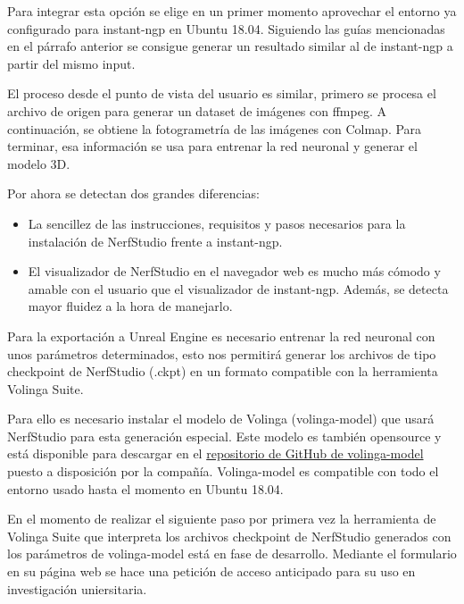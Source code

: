 \documentclass[a4paper, 12pt, spanish, twoside]{article}
\begin{document}
Para integrar esta opción se elige en un primer momento aprovechar el entorno ya configurado para instant-ngp en Ubuntu 18.04. Siguiendo las guías mencionadas en el párrafo anterior se consigue generar un resultado similar al de instant-ngp a partir del mismo input.  

El proceso desde el punto de vista del usuario es similar, primero se procesa el archivo de origen para generar un dataset de imágenes con ffmpeg. A continuación, se obtiene la fotogrametría de las imágenes con Colmap. Para terminar, esa información se usa para entrenar la red neuronal y generar el modelo 3D. 


 Por ahora se detectan dos grandes diferencias: 

\begin{itemize} 

\item La sencillez de las instrucciones, requisitos y pasos necesarios para la instalación de NerfStudio frente a instant-ngp. 

\item El visualizador de NerfStudio en el navegador web es mucho más cómodo y amable con el usuario que el visualizador de instant-ngp. Además, se detecta mayor fluidez a la hora de manejarlo. 

\end{itemize} 

Para la exportación a Unreal Engine es necesario entrenar la red neuronal con unos parámetros determinados, esto nos permitirá generar los archivos de tipo checkpoint de NerfStudio (.ckpt) en un formato compatible con la herramienta Volinga Suite. 

Para ello es necesario instalar el modelo de Volinga (volinga-model) que usará NerfStudio para esta generación especial. Este modelo es también opensource y está disponible para descargar en el \href{https://github.com/Volinga/volinga-model}{repositorio de GitHub de volinga-model} puesto a disposición por la compañía. Volinga-model es compatible con todo el entorno usado hasta el momento en Ubuntu 18.04. 

En el momento de realizar el siguiente paso por primera vez la herramienta de Volinga Suite que interpreta los archivos checkpoint de NerfStudio generados con los parámetros de volinga-model está en fase de desarrollo. Mediante el formulario en su página web se hace una petición de acceso anticipado para su uso en investigación uniersitaria.  
\end{document}
